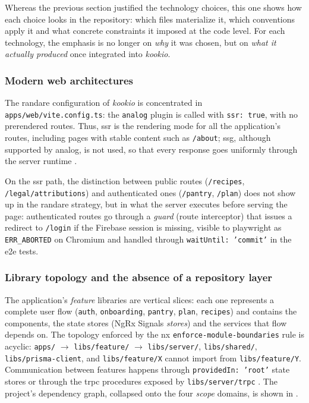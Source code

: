 Whereas the previous section justified the technology choices, this one shows how each choice looks in the repository: which files materialize it, which conventions apply it and what concrete constraints it imposed at the code level. For each technology, the emphasis is no longer on \textit{why} it was chosen, but on \textit{what it actually produced} once integrated into \textit{\gls{kookio}}.

\subsubsection{Modern web architectures}\label{subsec:arhitecturi-implementare}

The \gls{randare} configuration of \textit{\gls{kookio}} is concentrated in \texttt{apps/web/vite.config.ts}: the \texttt{analog} plugin is called with \texttt{ssr: true}, with no prerendered routes. Thus, \acrshort{ssr} is the rendering mode for all the application's routes, including pages with stable content such as \texttt{/about}; \acrshort{ssg}, although supported by \gls{analog}, is not used, so that every response goes uniformly through the server runtime \cite{analog}.

On the \acrshort{ssr} path, the distinction between public routes (\texttt{/recipes}, \texttt{/legal/\allowbreak attributions}) and authenticated ones (\texttt{/pantry}, \texttt{/plan}) does not show up in the \gls{randare} strategy, but in what the server executes before serving the page: authenticated routes go through a \textit{guard} (route interceptor) that issues a redirect to \texttt{/login} if the Firebase session is missing, visible to \gls{playwright} as \texttt{ERR\_ABORTED} on Chromium and handled through \texttt{waitUntil: 'commit'} in the \acrshort{e2e} tests.

\subsubsection{Library topology and the absence of a repository layer}\label{subsec:topologie-biblioteci}

The application's \textit{feature} libraries are vertical slices: each one represents a complete user flow (\texttt{auth}, \texttt{onboarding}, \texttt{pantry}, \texttt{plan}, \texttt{recipes}) and contains the components, the state stores (NgRx Signals \textit{stores}) and the services that flow depends on. The topology enforced by the \gls{nx} \texttt{enforce-module-boundaries} rule is acyclic: \texttt{apps/} \(\rightarrow\) \texttt{libs/feature/} \(\rightarrow\) \texttt{libs/server/}, \texttt{libs/shared/}, \texttt{libs/prisma-client}, and \texttt{libs/feature/X} cannot import from \texttt{libs/feature/Y}. Communication between features happens through \texttt{providedIn: 'root'} state stores or through the \gls{trpc} procedures exposed by \texttt{libs/server/trpc} \cite{nx,nx_boundaries,trpc}. The project's dependency graph, collapsed onto the four \textit{scope} domains, is shown in .

